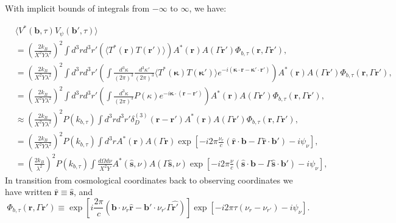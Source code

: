 \documentclass[twocolumn,apj,numberedappendix]{emulateapj}
\renewcommand\[{\begin{equation}}
\renewcommand\]{\end{equation}}
\begin{document}
With implicit bounds of integrals from $-\infty$ to $\infty$, we have:
\begin{widetext}
\begin{equation}
\begin{aligned} & \langle V^{*}(\boldsymbol{b},\tau)V_{\psi}(\boldsymbol{b'},\tau)\rangle\\
 & =\left(\frac{2k_{B}}{X^{2}Y\lambda^{2}}\right)^{2}\int d^{3}rd^{3}r'\left(\langle T^{*}(\boldsymbol{r})T(\boldsymbol{r'})\rangle\right)A^{*}(\boldsymbol{r})A(\Gamma \boldsymbol{r'})\Phi_{b,\tau}(\boldsymbol{r},\Gamma \boldsymbol{r'}),\\
 & =\left(\frac{2k_{B}}{X^{2}Y\lambda^{2}}\right)^{2}\int d^{3}rd^{3}r'\left(\int\frac{d^{3}\kappa}{(2\pi)^{3}}\frac{d^{3}\kappa'}{(2\pi)^{3}}\langle T^{*}(\boldsymbol{\kappa})T(\boldsymbol{\kappa'})\rangle e^{-i(\boldsymbol{\kappa}\cdot \boldsymbol{r}-\boldsymbol{\kappa'}\cdot\boldsymbol{r'})}\right)A^{*}(\boldsymbol{r})A(\Gamma \boldsymbol{r'})\Phi_{b,\tau}(\boldsymbol{r},\Gamma \boldsymbol{r'}),\\
 & =\left(\frac{2k_{B}}{X^{2}Y\lambda^{2}}\right)^{2}\int d^{3}rd^{3}r'\left(\int\frac{d^{3}\kappa}{(2\pi)^{3}}P(\kappa)e^{-i\boldsymbol{\kappa}\cdot(\boldsymbol{r}-\boldsymbol{r'})}\right)A^{*}(\boldsymbol{r})A(\Gamma \boldsymbol{r'})\Phi_{b,\tau}(\boldsymbol{r},\Gamma \boldsymbol{r'}),\\
 & \approx\left(\frac{2k_{B}}{X^{2}Y\lambda^{2}}\right)^{2}P(k_{b,\tau})\int d^{3}rd^{3}r'\delta_{D}^{(3)}(\boldsymbol{r}-\boldsymbol{r'})A^{*}(\boldsymbol{r})A(\Gamma \boldsymbol{r'})\Phi_{b,\tau}(\boldsymbol{r},\Gamma \boldsymbol{r'}),\\
 & =\left(\frac{2k_{B}}{X^{2}Y\lambda^{2}}\right)^{2}P(k_{b,\tau})\int d^{3}rA^{*}(\boldsymbol{r})A(\Gamma \boldsymbol{r})\exp\left[-i2\pi\frac{\nu_{r}}{c}\left(\hat{\boldsymbol{r}}\cdot\boldsymbol{b}-\Gamma \hat{\boldsymbol{r}}\cdot\boldsymbol{b'}\right)-i\psi_{\nu}\right],\\
 & =\left(\frac{2k_{B}}{\lambda^{2}}\right)^{2}P(k_{b,\tau})\int\frac{d\Omega d\nu}{X^{2}Y}A^{*}(\hat{\boldsymbol{s}},\nu)A(\Gamma \hat{\boldsymbol{s}},\nu)\exp\left[-i2\pi\frac{\nu}{c}\left(\hat{\boldsymbol{s}}\cdot\boldsymbol{b}-\Gamma\hat{\boldsymbol{s}}\cdot\boldsymbol{b'}\right)-i\psi_{\nu}\right],
\end{aligned}
\label{eq:main}
\end{equation}
In transition from cosmological coordinates back to observing coordinates we have written $\hat{\boldsymbol{r}}\equiv\hat{\boldsymbol{s}}$, and 
\begin{equation}
\Phi_{b,\tau}(\boldsymbol{r},\Gamma \boldsymbol{r'})\equiv\exp\left[i\frac{2\pi}{c}\left(\boldsymbol{b}\cdot\nu_{r}\hat{\boldsymbol{r}}-\boldsymbol{b'}\cdot\nu_{r'}\Gamma\hat{\boldsymbol{r'}}\right)\right]\exp\left[-i2\pi\tau\left(\nu_{r}-\nu_{r'}\right)-i\psi_{\nu}\right].
\end{equation}
\end{widetext}
\end{document}
